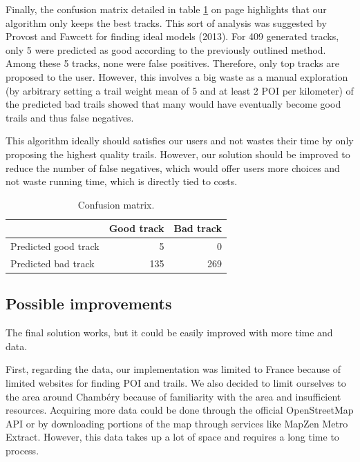 \documentclass[sigconf]{acmart}
\begin{document}
Finally, the confusion matrix detailed in table \ref{table:confusion_matrix} on page \pageref{table:confusion_matrix} highlights that our algorithm only keeps the best tracks. This sort of analysis was suggested by Provost and Fawcett for finding ideal models (2013). For 409 generated tracks, only 5 were predicted as good according to the previously outlined method. Among these 5 tracks, none were false positives. Therefore, only top tracks are proposed to the user. However, this involves a big waste as a manual exploration (by arbitrary setting a trail weight mean of 5 and at least 2 POI per kilometer) of the predicted bad trails showed that many would have eventually become good trails and thus false negatives.

This algorithm ideally should satisfies our users and not wastes their time by only proposing the highest quality trails. However, our solution should be improved to reduce the number of false negatives, which would offer users more choices and not waste running time, which is directly tied to costs.

\begin{table}
    \begin{tabular}{|lrr|} 
         \hline
         & Good track & Bad track \\
         \hline
         Predicted good track & 5 & 0
         \\
         Predicted bad track & 135 & 269
         \\
         \hline
    \end{tabular}
    \captionsetup{justification=centering}
    \caption{Confusion matrix.}
    \label{table:confusion_matrix}
\end{table}

\subsection{Possible improvements}

The final solution works, but it could be easily improved with more time and data.

First, regarding the data, our implementation was limited to France because of limited websites for finding POI and trails. We also decided to limit ourselves to the area around Chamb\'{e}ry because of familiarity with the area and insufficient resources. Acquiring more data could be done through the official OpenStreetMap API or by downloading portions of the map through services like MapZen Metro Extract. However, this data takes up a lot of space and requires a long time to process.
\end{document}
